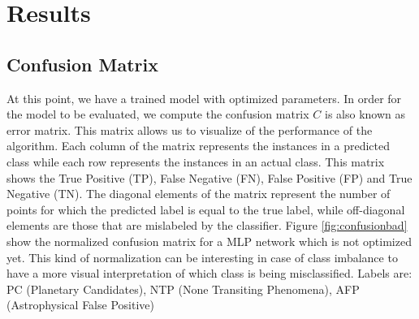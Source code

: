 \chapter{Results}



\section{Confusion Matrix}
At this point, we have a trained model with optimized parameters. In order for the model to be evaluated, we compute the confusion matrix $C$ is also known as error matrix. This matrix allows us to visualize of the performance of the algorithm. Each column of the matrix represents the instances in a predicted class while each row represents the instances in an actual class. This matrix shows the True Positive (TP), False Negative (FN), False Positive (FP) and True Negative (TN). The diagonal elements of the matrix represent the number of points for which the predicted label is equal to the true label, while off-diagonal elements are those that are mislabeled by the classifier. Figure \ref{fig:confusionbad} show the normalized confusion matrix for a MLP network which is not optimized yet. This kind of normalization can be interesting in case of class imbalance to have a more visual interpretation of which class is being misclassified. Labels are: PC (Planetary Candidates), NTP (None Transiting Phenomena),  AFP (Astrophysical False Positive) 

